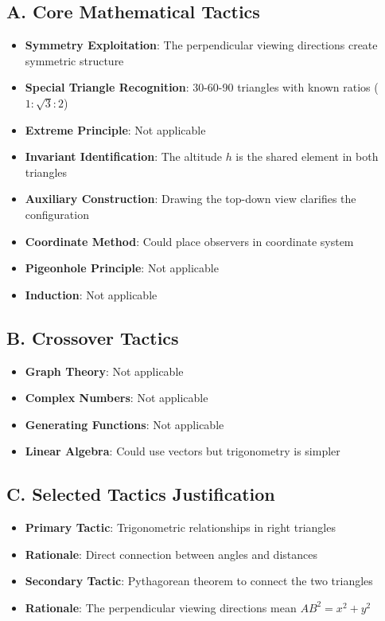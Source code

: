 \documentclass[12pt]{article}
\begin{document}
\begin{tacticalbox}
\subsection*{A. Core Mathematical Tactics}
\begin{itemize}[leftmargin=*]
    \item \textbf{Symmetry Exploitation}: The perpendicular viewing directions create symmetric structure
    \item \textbf{Special Triangle Recognition}: 30-60-90 triangles with known ratios ($1:\sqrt{3}:2$)
    \item \textbf{Extreme Principle}: Not applicable
    \item \textbf{Invariant Identification}: The altitude $h$ is the shared element in both triangles
    \item \textbf{Auxiliary Construction}: Drawing the top-down view clarifies the configuration
    \item \textbf{Coordinate Method}: Could place observers in coordinate system
    \item \textbf{Pigeonhole Principle}: Not applicable
    \item \textbf{Induction}: Not applicable
\end{itemize}

\subsection*{B. Crossover Tactics}
\begin{itemize}[leftmargin=*]
    \item \textbf{Graph Theory}: Not applicable
    \item \textbf{Complex Numbers}: Not applicable
    \item \textbf{Generating Functions}: Not applicable
    \item \textbf{Linear Algebra}: Could use vectors but trigonometry is simpler
\end{itemize}

\subsection*{C. Selected Tactics Justification}
\begin{itemize}[leftmargin=*]
    \item \textbf{Primary Tactic}: Trigonometric relationships in right triangles
    \item \textbf{Rationale}: Direct connection between angles and distances
    \item \textbf{Secondary Tactic}: Pythagorean theorem to connect the two triangles
    \item \textbf{Rationale}: The perpendicular viewing directions mean $AB^2 = x^2 + y^2$
\end{itemize}
\end{tacticalbox}
\end{document}
